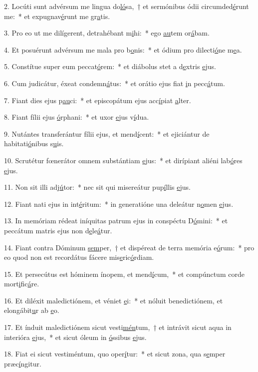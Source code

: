 2. Locúti sunt advérsum me lingua do\uline{ló}sa,~† et sermónibus ódii circumded\uline{é}runt me:~* et expugnav\uline{é}runt me gr\uline{a}tis.\par 
3. Pro eo ut me dilígerent, detrahébant m\uline{i}hi:~* ego \uline{au}tem or\uline{á}bam.\par 
4. Et posuérunt advérsum me mala pro b\uline{o}nis:~* et ódium pro dilecti\uline{ó}ne m\uline{e}a.\par 
5. Constítue super eum peccat\uline{ó}rem:~* et diábolus stet a d\uline{e}xtris \uline{e}jus.\par 
6. Cum judicátur, éxeat condemn\uline{á}tus:~* et orátio ejus fiat \uline{i}n pecc\uline{á}tum.\par 
7. Fiant dies ejus p\uline{au}ci:~* et episcopátum ejus acc\uline{í}piat \uline{a}lter.\par 
8. Fiant fílii ejus \uline{ó}rphani:~* et uxor \uline{e}jus v\uline{í}dua.\par 
9. Nutántes transferántur fílii ejus, et mend\uline{í}cent:~* et ejiciántur de habitati\uline{ó}nibus s\uline{u}is.\par 
10. Scrutétur fœnerátor omnem substántiam \uline{e}jus:~* et dirípiant aliéni lab\uline{ó}res \uline{e}jus.\par 
11. Non sit illi adj\uline{ú}tor:~* nec sit qui misereátur pup\uline{í}llis \uline{e}jus.\par 
12. Fiant nati ejus in int\uline{é}ritum:~* in generatióne una deleátur n\uline{o}men \uline{e}jus.\par 
13. In memóriam rédeat iníquitas patrum ejus in conspéctu D\uline{ó}mini:~* et peccátum matris ejus non d\uline{e}le\uline{á}tur.\par 
14. Fiant contra Dóminum \uline{sem}per,~† et dispéreat de terra memória e\uline{ó}rum:~* pro eo quod non est recordátus fácere mis\uline{e}ric\uline{ó}rdiam.\par 
15. Et persecútus est hóminem ínopem, et mend\uline{í}cum,~* et compúnctum corde mort\uline{i}fic\uline{á}re.\par 
16. Et diléxit maledictiónem, et véniet \uline{e}i:~* et nóluit benedictiónem, et elongábit\uline{u}r ab \uline{e}o.\par 
17. Et índuit maledictiónem sicut vesti\uline{mén}tum,~† et intrávit sicut aqua in interióra \uline{e}jus,~* et sicut óleum in \uline{ó}ssibus \uline{e}jus.\par 
18. Fiat ei sicut vestiméntum, quo oper\uline{í}tur:~* et sicut zona, qua s\uline{e}mper præc\uline{í}ngitur.\par 
